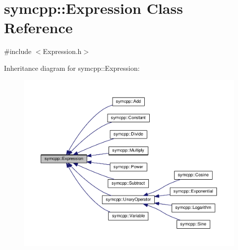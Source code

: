 \hypertarget{classsymcpp_1_1Expression}{}\section{symcpp\+:\+:Expression Class Reference}
\label{classsymcpp_1_1Expression}


{\ttfamily \#include $<$Expression.\+h$>$}



Inheritance diagram for symcpp\+:\+:Expression\+:\nopagebreak
\begin{figure}[H]
\begin{center}
\leavevmode
\includegraphics[width=350pt]{classsymcpp_1_1Expression__inherit__graph}
\end{center}
\end{figure}

